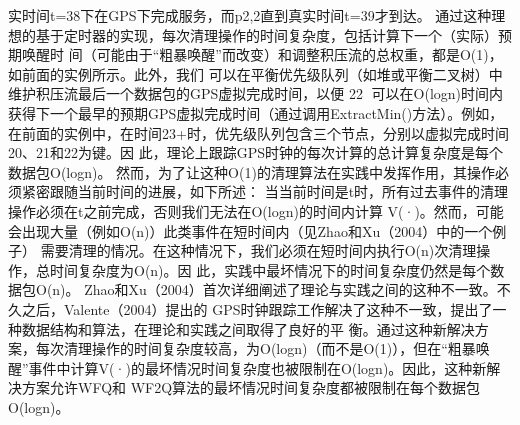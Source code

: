 实时间t=38下在GPS下完成服务，而p2,2直到真实时间t=39才到达。
通过这种理想的基于定时器的实现，每次清理操作的时间复杂度，包括计算下一个（实际）预期唤醒时
间（可能由于“粗暴唤醒”而改变）和调整积压流的总权重，都是O(1)，如前面的实例所示。此外，我们
可以在平衡优先级队列（如堆或平衡二叉树）中维护积压流最后一个数据包的GPS虚拟完成时间，以便
                                                                               22
可以在O(logn)时间内获得下一个最早的预期GPS虚拟完成时间（通过调用ExtractMin()方法）。例如，
在前面的实例中，在时间23+时，优先级队列包含三个节点，分别以虚拟完成时间20、21和22为键。因
此，理论上跟踪GPS时钟的每次计算的总计算复杂度是每个数据包O(logn)。
然而，为了让这种O(1)的清理算法在实践中发挥作用，其操作必须紧密跟随当前时间的进展，如下所述：
当当前时间是t时，所有过去事件的清理操作必须在t之前完成，否则我们无法在O(logn)的时间内计算
V(·)。然而，可能会出现大量（例如O(n)）此类事件在短时间内（见Zhao和Xu（2004）中的一个例子）
需要清理的情况。在这种情况下，我们必须在短时间内执行O(n)次清理操作，总时间复杂度为O(n)。因
此，实践中最坏情况下的时间复杂度仍然是每个数据包O(n)。
Zhao和Xu（2004）首次详细阐述了理论与实践之间的这种不一致。不久之后，Valente（2004）提出的
GPS时钟跟踪工作解决了这种不一致，提出了一种数据结构和算法，在理论和实践之间取得了良好的平
衡。通过这种新解决方案，每次清理操作的时间复杂度较高，为O(logn)（而不是O(1)），但在“粗暴唤
醒”事件中计算V(·)的最坏情况时间复杂度也被限制在O(logn)。因此，这种新解决方案允许WFQ和
WF2Q算法的最坏情况时间复杂度都被限制在每个数据包O(logn)。

